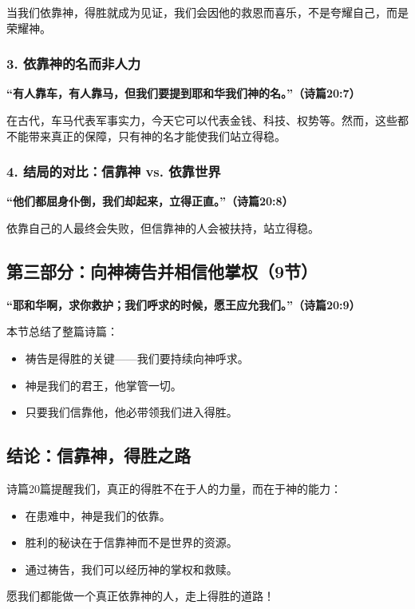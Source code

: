 \documentclass[a4paper, 12pt]{article}
\begin{document}
当我们依靠神，得胜就成为见证，我们会因他的救恩而喜乐，不是夸耀自己，而是荣耀神。

\subsubsection*{3. 依靠神的名而非人力}
\textbf{“有人靠车，有人靠马，但我们要提到耶和华我们神的名。”（诗篇20:7）}

在古代，车马代表军事实力，今天它可以代表金钱、科技、权势等。然而，这些都不能带来真正的保障，只有神的名才能使我们站立得稳。

\subsubsection*{4. 结局的对比：信靠神 vs. 依靠世界}
\textbf{“他们都屈身仆倒，我们却起来，立得正直。”（诗篇20:8）}

依靠自己的人最终会失败，但信靠神的人会被扶持，站立得稳。

\subsection*{第三部分：向神祷告并相信他掌权（9节）}

\textbf{“耶和华啊，求你救护；我们呼求的时候，愿王应允我们。”（诗篇20:9）}

本节总结了整篇诗篇：
\begin{itemize}
    \item 祷告是得胜的关键——我们要持续向神呼求。
    \item 神是我们的君王，他掌管一切。
    \item 只要我们信靠他，他必带领我们进入得胜。
\end{itemize}

\subsection*{结论：信靠神，得胜之路}

诗篇20篇提醒我们，真正的得胜不在于人的力量，而在于神的能力：
\begin{itemize}
    \item 在患难中，神是我们的依靠。
    \item 胜利的秘诀在于信靠神而不是世界的资源。
    \item 通过祷告，我们可以经历神的掌权和救赎。
\end{itemize}

愿我们都能做一个真正依靠神的人，走上得胜的道路！
\end{document}
